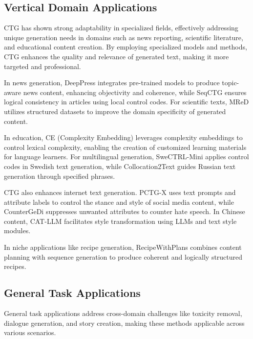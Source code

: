 \documentclass[acmsmall, screen]{acmart}
\begin{document}
\subsection{Vertical Domain Applications}
CTG has shown strong adaptability in specialized fields, effectively addressing unique generation needs in domains such as news reporting, scientific literature, and educational content creation. By employing specialized models and methods, CTG enhances the quality and relevance of generated text, making it more targeted and professional.

In news generation, DeepPress\cite{rahali_2023_DeepPress} integrates pre-trained models to produce topic-aware news content, enhancing objectivity and coherence, while SeqCTG\cite{spangher_acl22_SeqCTG} ensures logical consistency in articles using local control codes. For scientific texts, MReD\cite{shen_acl22_MReD} utilizes structured datasets to improve the domain specificity of generated content.

In education, CE (Complexity Embedding)\cite{jinran_ccl23_CE} leverages complexity embeddings to control lexical complexity, enabling the creation of customized learning materials for language learners. For multilingual generation, SweCTRL-Mini\cite{kalpakchi_arxiv23_SweCTRL-Mini} applies control codes in Swedish text generation, while Collocation2Text\cite{Vychegzhanin_arxiv22_Collocation2Text} guides Russian text generation through specified phrases.

CTG also enhances internet text generation. PCTG-X\cite{yang_2024_PCTGX} uses text prompts and attribute labels to control the stance and style of social media content, while CounterGeDi\cite{saha_ijcai22_CounterGeDi} suppresses unwanted attributes to counter hate speech. In Chinese content, CAT-LLM\cite{tao_arxiv24_CAT} facilitates style transformation using LLMs and text style modules.

In niche applications like recipe generation, RecipeWithPlans\cite{liu_acl22_RecipeWithPlans} combines content planning with sequence generation to produce coherent and logically structured recipes.

\subsection{General Task Applications}
General task applications address cross-domain challenges like toxicity removal, dialogue generation, and story creation, making these methods applicable across various scenarios.
\end{document}
